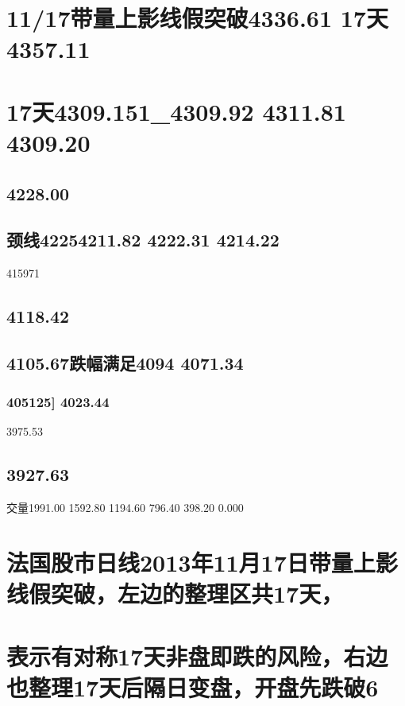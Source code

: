 \documentclass{article}
\begin{document}
\section{11/17带量上影线假突破4336.61 17天4357.11}

\section{17天4309.151\_4309.92 4311.81 4309.20}

\subsection{4228.00}

\subsection{颈线42254211.82 4222.31 4214.22}

415971

\subsection{4118.42}

\subsection{4105.67跌幅满足4094 4071.34}

\subsubsection{405125] 4023.44}

3975.53

\subsection{3927.63}

交量1991.00 1592.80 1194.60 796.40 398.20 0.000

\section{法国股市日线2013年11月17日带量上影线假突破，左边的整理区共17天，}

\section{表示有对称17天非盘即跌的风险，右边也整理17天后隔日变盘，开盘先跌破6}
\end{document}
